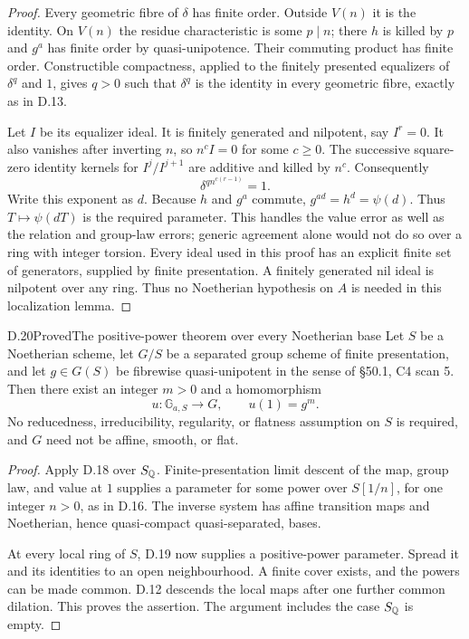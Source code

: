 \begin{proof}
Every geometric fibre of $\delta$ has finite order. Outside
$V(n)$ it is the identity. On $V(n)$ the residue characteristic
is some $p\mid n$; there $h$ is killed by $p$ and $g^a$ has
finite order by quasi-unipotence. Their commuting product has
finite order. Constructible compactness, applied to the
finitely presented equalizers of $\delta^q$ and $1$, gives
$q>0$ such that $\delta^q$ is the identity in every geometric
fibre, exactly as in D.13.

Let $I$ be its equalizer ideal. It is finitely generated and
nilpotent, say $I^r=0$. It also vanishes after inverting $n$,
so $n^c I=0$ for some $c\ge0$. The successive square-zero
identity kernels for $I^j/I^{j+1}$ are additive and killed
by $n^c$. Consequently
\[
                         \delta^{q n^{c(r-1)}}=1.
\]
Write this exponent as $d$. Because $h$ and $g^a$ commute,
$g^{ad}=h^d=\psi(d)$. Thus $T\mapsto\psi(dT)$ is the required
parameter. This handles the value error as well as the relation
and group-law errors; generic agreement alone would not do so
over a ring with integer torsion.
Every ideal used in this proof has an explicit finite set of
generators, supplied by finite presentation. A finitely generated
nil ideal is nilpotent over any ring. Thus no Noetherian hypothesis
on $A$ is needed in this localization lemma.
\end{proof}

\begin{statement}{D.20}{Proved}{The positive-power theorem over every Noetherian base}
Let $S$ be a Noetherian scheme, let $G/S$ be a separated group
scheme of finite presentation, and let $g\in G(S)$ be fibrewise
quasi-unipotent in the sense of \S50.1, C4 scan 5. Then there
exist an integer $m>0$ and a homomorphism
\[
                 u:\mathbb G_{a,S}\longrightarrow G,
                 \qquad u(1)=g^m.
\]
No reducedness, irreducibility, regularity, or flatness assumption
on $S$ is required, and $G$ need not be affine, smooth, or flat.
\end{statement}
\begin{proof}
Apply D.18 over $S_{\mathbb Q}$. Finite-presentation limit descent
of the map, group law, and value at $1$ supplies a parameter
for some power over $S[1/n]$, for one integer $n>0$, as in
D.16. The inverse system has affine transition maps and
Noetherian, hence quasi-compact quasi-separated, bases.

At every local ring of $S$, D.19 now supplies a positive-power
parameter. Spread it and its identities to an open neighbourhood.
A finite cover exists, and the powers can be made common.
D.12 descends the local maps after one further common dilation.
This proves the assertion. The argument includes the case
$S_{\mathbb Q}$ is empty.
\end{proof}


